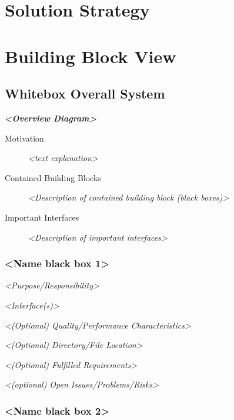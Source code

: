 \documentclass[
]{article}
\begin{document}
\hypertarget{section-solution-strategy}{%
\section{Solution Strategy}\label{section-solution-strategy}}

\hypertarget{section-building-block-view}{%
\section{Building Block View}\label{section-building-block-view}}

\hypertarget{_whitebox_overall_system}{%
\subsection{Whitebox Overall System}\label{_whitebox_overall_system}}

\emph{\textbf{\textless Overview Diagram\textgreater{}}}

\begin{description}
\item[Motivation]
\emph{\textless text explanation\textgreater{}}
\item[Contained Building Blocks]
\emph{\textless Description of contained building block (black
boxes)\textgreater{}}
\item[Important Interfaces]
\emph{\textless Description of important interfaces\textgreater{}}
\end{description}

\hypertarget{__name_black_box_1}{%
\subsubsection{\textless Name black box
1\textgreater{}}\label{__name_black_box_1}}

\emph{\textless Purpose/Responsibility\textgreater{}}

\emph{\textless Interface(s)\textgreater{}}

\emph{\textless(Optional) Quality/Performance
Characteristics\textgreater{}}

\emph{\textless(Optional) Directory/File Location\textgreater{}}

\emph{\textless(Optional) Fulfilled Requirements\textgreater{}}

\emph{\textless(optional) Open Issues/Problems/Risks\textgreater{}}

\hypertarget{__name_black_box_2}{%
\subsubsection{\textless Name black box
2\textgreater{}}\label{__name_black_box_2}}
\end{document}
